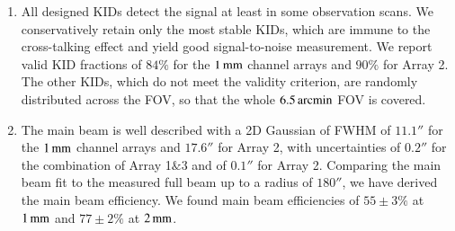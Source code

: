 \documentclass[traditionalabstract]{aa}
\begin{document}
\begin{enumerate}
\item %
  All designed KIDs detect the
  signal at least in some observation
  scans. We conservatively retain only the most stable KIDs, which are
  immune to the cross-talking effect and yield good signal-to-noise
  measurement. %
  We report valid KID fractions of $84\%$
  for the $1\,\rm{mm}$ channel arrays and $90\%$ for Array 2. The other
  KIDs, which do not meet the validity criterion, are randomly
  distributed across the FOV, so that the whole $6.5\,\rm{arcmin}$ FOV is
  covered.
  \vspace{1mm}
\item %
  The main beam is well described with a 2D
  Gaussian of FWHM of $11.1''$ for the $1\,\rm{mm}$ channel arrays
  and $17.6''$ for Array 2, with uncertainties of $0.2''$ for the
  combination of Array 1$\&$3 and of $0.1''$ for Array 2.
  Comparing the main beam fit to the measured full beam up to a radius of $180''$, we have derived the
  main beam efficiency. We found main beam
  efficiencies of $55 \pm 3 \%$ at $1\,\rm{mm}$ and $77 \pm 2 \%$ at
  $2\,\rm{mm}$.

\end{enumerate}
\end{document}

